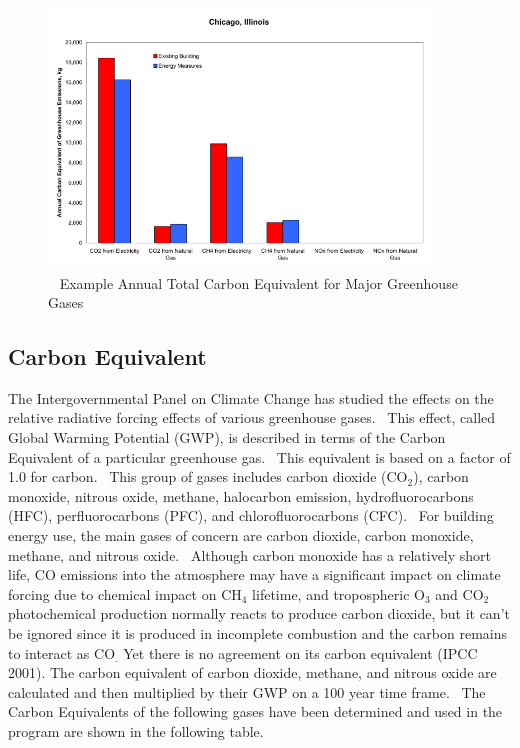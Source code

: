 \begin{figure}[hbtp] %
\centering
\includegraphics[width=0.9\textwidth, height=0.9\textheight, keepaspectratio=true]{media/image7911.svg.png}
\caption{  Example Annual Total Carbon Equivalent for Major Greenhouse Gases \protect \label{fig:example-annual-total-carbon-equivalent-for}}
\end{figure}

\subsection{Carbon Equivalent}\label{carbon-equivalent}

The Intergovernmental Panel on Climate Change has studied the effects on the relative radiative forcing effects of various greenhouse gases.~ This effect, called Global Warming Potential (GWP), is described in terms of the Carbon Equivalent of a particular greenhouse gas.~ This equivalent is based on a factor of 1.0 for carbon.~ This group of gases includes carbon dioxide (CO\(_{2}\)), carbon monoxide, nitrous oxide, methane, halocarbon emission, hydrofluorocarbons (HFC), perfluorocarbons (PFC), and chlorofluorocarbons (CFC).~ For building energy use, the main gases of concern are carbon dioxide, carbon monoxide, methane, and nitrous oxide.~ Although carbon monoxide has a relatively short life, CO emissions into the atmosphere may have a significant impact on climate forcing due to chemical impact on CH\(_{4}\) lifetime, and tropospheric O\(_{3}\) and CO\(_{2}\) photochemical production normally reacts to produce carbon dioxide, but it can't be ignored since it is produced in incomplete combustion and the carbon remains to interact as CO\(_{.}\) Yet there is no agreement on its carbon equivalent (IPCC 2001). The carbon equivalent of carbon dioxide, methane, and nitrous oxide are calculated and then multiplied by their GWP on a 100 year time frame.~ The Carbon Equivalents of the following gases have been determined and used in the program are shown in the following table.

